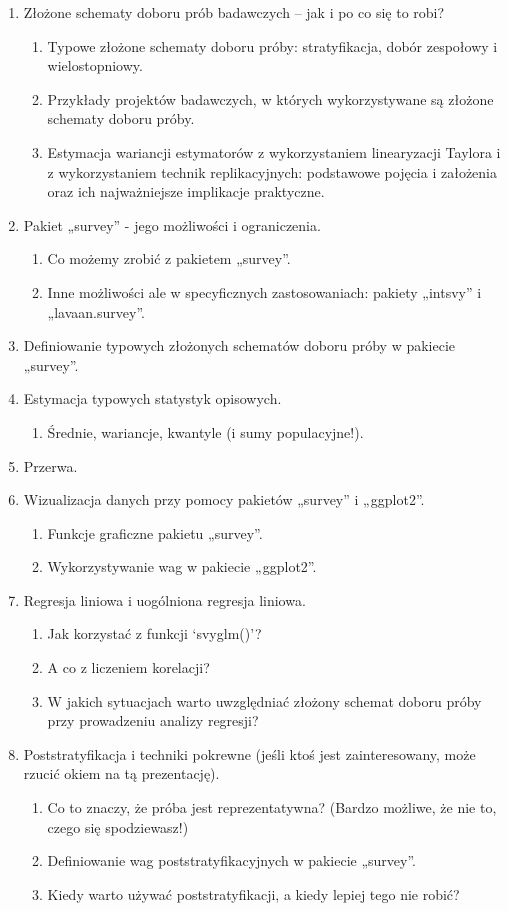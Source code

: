 \documentclass[\main/boa.tex]{subfiles}
\begin{document}
\planwarsztatu
\begin{enumerate}
\item Złożone schematy doboru prób badawczych – jak i po co się to robi?
\begin{enumerate}
	\item Typowe złożone schematy doboru próby: stratyfikacja, dobór zespołowy i wielostopniowy.
	\item Przykłady projektów badawczych, w których wykorzystywane są złożone schematy doboru próby.
    \item Estymacja wariancji estymatorów z wykorzystaniem linearyzacji Taylora i z wykorzystaniem technik replikacyjnych: podstawowe pojęcia i założenia oraz ich najważniejsze implikacje praktyczne.
\end{enumerate}
\item Pakiet „survey” - jego możliwości i ograniczenia.
\begin{enumerate}
	\item Co możemy zrobić z pakietem „survey”.
	\item Inne możliwości ale w specyficznych zastosowaniach: pakiety „intsvy” i „lavaan.survey”.
\end{enumerate}
\item Definiowanie typowych złożonych schematów doboru próby w pakiecie „survey”.
\item Estymacja typowych statystyk opisowych.
\begin{enumerate}
	\item Średnie, wariancje, kwantyle (i sumy populacyjne!).
\end{enumerate}
\item Przerwa.
\item Wizualizacja danych przy pomocy pakietów „survey” i „ggplot2”.
\begin{enumerate}
	\item Funkcje graficzne pakietu „survey”.
	\item Wykorzystywanie wag w pakiecie „ggplot2”.
\end{enumerate}
\item Regresja liniowa i uogólniona regresja liniowa.
\begin{enumerate}
	\item Jak korzystać z funkcji ‘svyglm()’?
	\item A co z liczeniem korelacji?
	\item W jakich sytuacjach warto uwzględniać złożony schemat doboru próby przy prowadzeniu analizy regresji?
\end{enumerate}
\item Poststratyfikacja i techniki pokrewne (jeśli ktoś jest zainteresowany, może rzucić okiem na tą prezentację).
\begin{enumerate}
	\item Co to znaczy, że próba jest reprezentatywna? (Bardzo możliwe, że nie to, czego się spodziewasz!)
	\item Definiowanie wag poststratyfikacyjnych w pakiecie „survey”.
	\item Kiedy warto używać poststratyfikacji, a kiedy lepiej tego nie robić?
\end{enumerate}	 
\end{enumerate}
\end{document}
